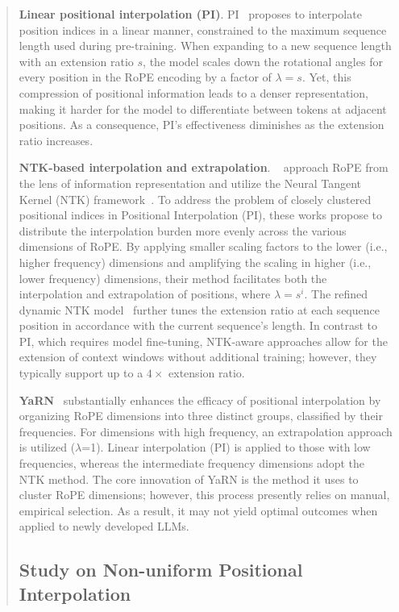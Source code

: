 \begin{abstract}
\textbf{Linear positional interpolation (PI)}. PI~\cite{pi} proposes to interpolate position indices in a linear manner, constrained to the maximum sequence length used during pre-training. When expanding to a new sequence length with an extension ratio $s$, the model scales down the rotational angles for every position in the RoPE encoding by a factor of $\lambda=s$. Yet, this compression of positional information leads to a denser representation, making it harder for the model to differentiate between tokens at adjacent positions. As a consequence, PI's effectiveness diminishes as the extension ratio increases.

\textbf{NTK-based interpolation and extrapolation}. ~\cite{ntk,dynamicntk} approach RoPE from the lens of information representation and utilize the Neural Tangent Kernel (NTK) framework~\cite{jacot2018neural,tancik2020fourier}. To address the problem of closely clustered positional indices in Positional Interpolation (PI), these works propose to distribute the interpolation burden more evenly across the various dimensions of RoPE. By applying smaller scaling factors to the lower (i.e., higher frequency) dimensions and amplifying the scaling in higher (i.e., lower frequency) dimensions, their method facilitates both the interpolation and extrapolation of positions, where $\lambda=s^{i}$. The refined dynamic NTK model~\cite{dynamicntk} further tunes the extension ratio at each sequence position in accordance with the current sequence's length. In contrast to PI, which requires model fine-tuning, NTK-aware approaches allow for the extension of context windows without additional training; however, they typically support up to a $4\times$ extension ratio.

\textbf{YaRN}~\cite{yarn} substantially enhances the efficacy of positional interpolation by organizing RoPE dimensions into three distinct groups, classified by their frequencies. For dimensions with high frequency, an extrapolation approach is utilized ($\lambda$=1). Linear interpolation (PI) is applied to those with low frequencies, whereas the intermediate frequency dimensions adopt the NTK method. The core innovation of YaRN is the method it uses to cluster RoPE dimensions; however, this process presently relies on manual, empirical selection. As a result, it may not yield optimal outcomes when applied to newly developed LLMs.

\subsection{Study on Non-uniform Positional Interpolation}


\end{abstract}
